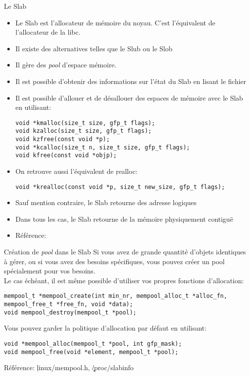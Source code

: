 \begin{frame}[fragile=singleslide]{Le Slab}
  \begin{itemize}
  \item  Le   Slab  est  l'allocateur  de  mémoire   du  noyau.  C'est
    l'équivalent de l'allocateur de la libc.
  \item Il existe des alternatives telles que le Slub ou le Slob
  \item Il gère des \emph{pool} d'espace mémoire.
  \item Il est possible d'obtenir  des informations sur l'état du Slab
    en lisant le fichier 
  \item  Il est  possible d'allouer  et  de désallouer  des espaces  de
    mémoire avec le Slab en utilisant:
    \begin{lstlisting}
void *kmalloc(size_t size, gfp_t flags);
void kzalloc(size_t size, gfp_t flags);
void kzfree(const void *p);
void *kcalloc(size_t n, size_t size, gfp_t flags);
void kfree(const void *objp);
    \end{lstlisting}
  \item On retrouve aussi l'équivalent de \c{realloc}:
    \begin{lstlisting}
void *krealloc(const void *p, size_t new_size, gfp_t flags);
    \end{lstlisting}
  \item Sauf mention contraire, le Slab retourne des adresse logiques
  \item Dans tous les cas, le Slab retourne de la mémoire physiquement
    contiguë
  \item Référence: 
  \end{itemize}
\end{frame}

\begin{frame}[fragile=singleslide]{Création de \emph{pool} dans le Slab}
  Si vous avez  de grande quantité d'objets identiques  à gérer, ou si
  vous  avez  des  besoins  spécifiques,  vous pouvez  créer  un  pool
  spécialement pour vos besoins.
  \\[2ex]
  Le  cas  échéant,  il  est  même  possible  d'utiliser  vos  propres
  fonctions d'allocation:
  \begin{lstlisting}
mempool_t *mempool_create(int min_nr, mempool_alloc_t *alloc_fn, mempool_free_t *free_fn, void *data);
void mempool_destroy(mempool_t *pool);
  \end{lstlisting}
  Vous  pouvez   garder  la  politique  d'allocation   par  défaut  en
  utilisant:
  \begin{lstlisting}
void *mempool_alloc(mempool_t *pool, int gfp_mask);
void mempool_free(void *element, mempool_t *pool);
  \end{lstlisting}
  Référence: \c{linux/mempool.h}, \c{/proc/slabinfo}
\end{frame}


